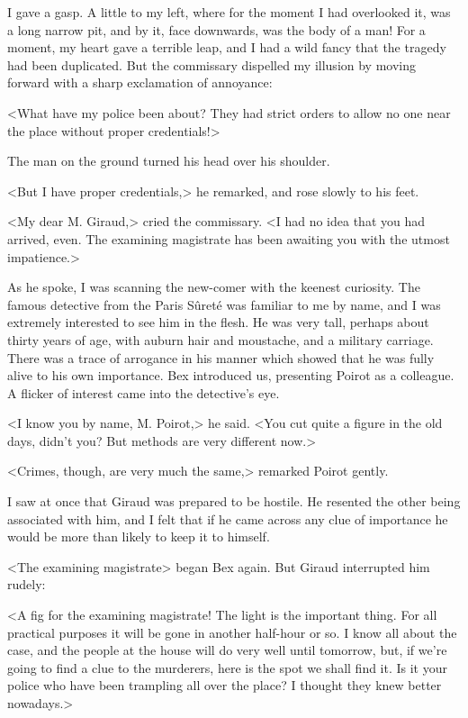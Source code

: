  I gave a gasp. A little to my left, where for the moment I had overlooked it, was a long narrow pit, and by it, face downwards, was the body of a man! For a moment, my heart gave a terrible leap, and I had a wild fancy that the tragedy had been duplicated. But the commissary dispelled my illusion by moving forward with a sharp exclamation of annoyance: 

 <What have my police been about? They had strict orders to allow no one near the place without proper credentials!> 

 The man on the ground turned his head over his shoulder. 

 <But I have proper credentials,> he remarked, and rose slowly to his feet. 

 <My dear M. Giraud,> cried the commissary. <I had no idea that you had arrived, even. The examining magistrate has been awaiting you with the utmost impatience.> 

 As he spoke, I was scanning the new-comer with the keenest curiosity. The famous detective from the Paris Sûreté was familiar to me by name, and I was extremely interested to see him in the flesh. He was very tall, perhaps about thirty years of age, with auburn hair and moustache, and a military carriage. There was a trace of arrogance in his manner which showed that he was fully alive to his own importance. Bex introduced us, presenting Poirot as a colleague. A flicker of interest came into the detective's eye. 

 <I know you by name, M. Poirot,> he said. <You cut quite a figure in the old days, didn't you? But methods are very different now.> 

 <Crimes, though, are very much the same,> remarked Poirot gently. 

 I saw at once that Giraud was prepared to be hostile. He resented the other being associated with him, and I felt that if he came across any clue of importance he would be more than likely to keep it to himself. 

 <The examining magistrate\longdash> began Bex again. But Giraud interrupted him rudely: 

 <A fig for the examining magistrate! The light is the important thing. For all practical purposes it will be gone in another half-hour or so. I know all about the case, and the people at the house will do very well until tomorrow, but, if we're going to find a clue to the murderers, here is the spot we shall find it. Is it your police who have been trampling all over the place? I thought they knew better nowadays.> 

